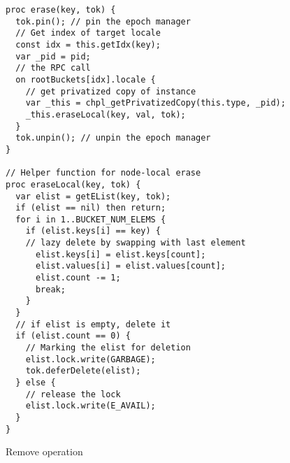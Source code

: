 \documentclass[letterpaper, 10 pt, conference]{ieeeconf}  %
\begin{document}
\begin{listing}
 \begin{verbatim}
proc erase(key, tok) {
  tok.pin(); // pin the epoch manager
  // Get index of target locale
  const idx = this.getIdx(key);
  var _pid = pid;
  // the RPC call
  on rootBuckets[idx].locale {
    // get privatized copy of instance
    var _this = chpl_getPrivatizedCopy(this.type, _pid);
    _this.eraseLocal(key, val, tok);
  }
  tok.unpin(); // unpin the epoch manager
}

// Helper function for node-local erase
proc eraseLocal(key, tok) {
  var elist = getEList(key, tok);
  if (elist == nil) then return;
  for i in 1..BUCKET_NUM_ELEMS {
    if (elist.keys[i] == key) {
    // lazy delete by swapping with last element
      elist.keys[i] = elist.keys[count];
      elist.values[i] = elist.values[count];
      elist.count -= 1;
      break;
    }
  }
  // if elist is empty, delete it
  if (elist.count == 0) {
    // Marking the elist for deletion
    elist.lock.write(GARBAGE);
    tok.deferDelete(elist);
  } else {
    // release the lock
    elist.lock.write(E_AVAIL);
  }
}
\end{verbatim}
\caption{Remove operation}
\label{lst:remove}
\end{listing}


\end{document}
